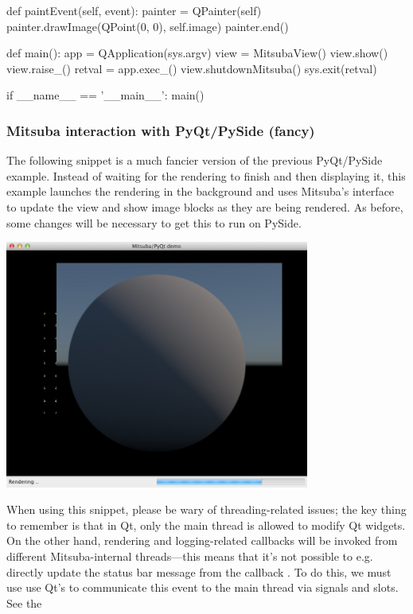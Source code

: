 \begin{python}
    def paintEvent(self, event):
        painter = QPainter(self)
        painter.drawImage(QPoint(0, 0), self.image)
        painter.end()

def main():
    app = QApplication(sys.argv)
    view = MitsubaView()
    view.show()
    view.raise_()
    retval = app.exec_()
    view.shutdownMitsuba()
    sys.exit(retval)

if __name__ == '__main__':
    main()
\end{python}

\subsubsection{Mitsuba interaction with PyQt/PySide (fancy)}
The following snippet is a much fancier version of the previous PyQt/PySide example.
Instead of waiting for the rendering to finish and then displaying it, this example launches the
rendering in the background and uses Mitsuba's  interface to update the
view and show image blocks as they are being rendered.
As before, some changes will be necessary to get this to run on PySide.
\begin{center}
    \includegraphics[width=10cm]{images/python_demo.jpg}
\end{center}
When using this snippet, please be wary of threading-related issues; the key thing to remember is that
in Qt, only the main thread is allowed to modify Qt widgets. On the other hand, rendering and logging-related
callbacks will be invoked from different Mitsuba-internal threads---this means that it's not possible to e.g.
directly update the status bar message from the callback . To do this, we must use
use Qt's  to communicate this event to the main thread via signals and slots. See the
